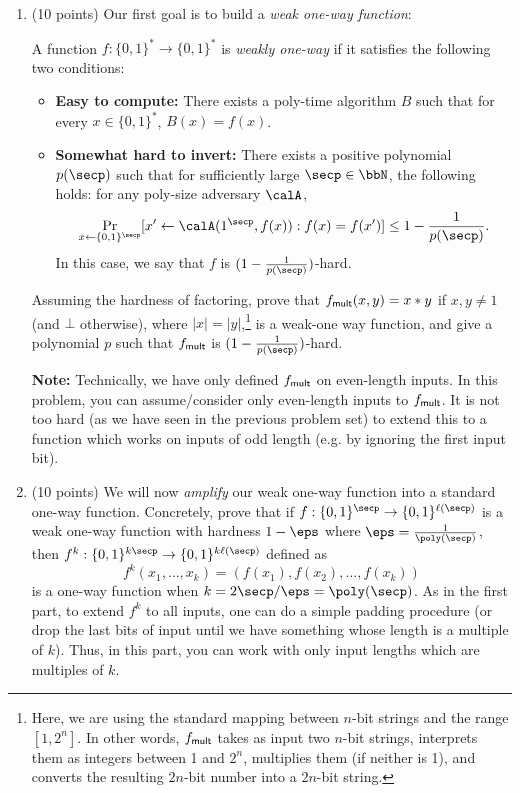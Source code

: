 \documentclass{article}
\begin{document}
\begin{enumerate}
    \item (10 points) Our first goal is to build a \emph{weak one-way function}:
    \begin{definition}
        A function $f: \{0, 1\}^{*} \to \{0, 1\}^{*}$ is \emph{weakly one-way} if it satisfies the following two conditions:
        \begin{itemize}
            \item \textbf{Easy to compute:} There exists a poly-time algorithm $B$ such that for every $x \in \{0, 1\}^{*}$, $B(x) = f(x)$.
            \item \textbf{Somewhat hard to invert:} There exists a positive polynomial $p(\secp)$ such that for sufficiently large $\secp \in \bbN$, the following holds: for any poly-size adversary $\calA$, 
                \[ \Pr_{x \gets \{0, 1\}^\secp}[x' \gets \calA(1^{\secp}, f(x)) : f(x) = f(x')] \leq 1-\frac{1}{p(\secp)}. \]
            In this case, we say that $f$ is $(1-\frac{1}{p(\secp)})$-hard.
        \end{itemize}
    \end{definition}
    Assuming the hardness of factoring, prove that $f_{\mathsf{mult}}(x, y) = x * y$ if $x, y \neq 1$ (and $\bot$ otherwise), where $|x| = |y|$,\footnote{Here, we are using the standard mapping between $n$-bit strings and the range $[1, 2^n]$. In other words, $f_{\mathsf{mult}}$ takes as input two $n$-bit strings, interprets them as integers between 1 and $2^n$, multiplies them (if neither is 1), and converts the resulting $2n$-bit number into a $2n$-bit string.} is a weak-one way function, and give a polynomial $p$ such that $f_{\mathsf{mult}}$ is $(1-\frac{1}{p(\secp)})$-hard.
    
    \textbf{Note:} Technically, we have only defined $f_{\mathsf{mult}}$ on even-length inputs. In this problem, you can assume/consider only even-length inputs to $f_{\mathsf{mult}}$. It is not too hard (as we have seen in the previous problem set) to extend this to a function which works on inputs of odd length (e.g. by ignoring the first input bit).
    \item (10 points) We will now \emph{amplify} our weak one-way function into a standard one-way function. Concretely, prove that if $f: \{0, 1\}^{\secp} \to \{0, 1\}^{\ell(\secp)}$ is a weak one-way function with hardness $1-\eps$ where $\eps = \frac{1}{\poly(\secp)}$, then $f^k : \{0, 1\}^{k\secp} \to \{0, 1\}^{k\ell(\secp)}$ defined as
        \[ f^k(x_1, \ldots, x_k) = (f(x_1), f(x_2), \ldots, f(x_k)) \]
    is a one-way function when $k = 2\secp/\eps = \poly(\secp)$. As in the first part, to extend $f^k$ to all inputs, one can do a simple padding procedure (or drop the last bits of input until we have something whose length is a multiple of $k$). Thus, in this part, you can work with only input lengths which are multiples of $k$.
\end{enumerate}
\end{document}
